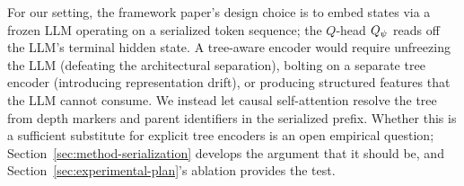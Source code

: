 For our setting, the framework paper's design choice is to embed states
via a frozen LLM operating on a serialized token sequence; the $Q$-head
$Q_{\psi}$ reads off the LLM's terminal hidden state. A tree-aware encoder
would require unfreezing the LLM (defeating the architectural
separation), bolting on a separate tree encoder (introducing
representation drift), or producing structured features that the LLM
cannot consume. We instead let causal self-attention resolve the tree
from depth markers and parent identifiers in the serialized prefix.
Whether this is a sufficient substitute for explicit tree encoders is
an open empirical question; Section~\ref{sec:method-serialization}
develops the argument that it should be, and
Section~\ref{sec:experimental-plan}'s ablation provides the test.
